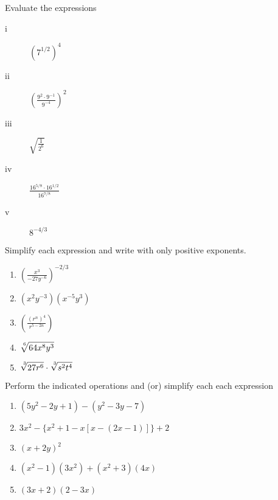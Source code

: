 \documentclass[11pt]{article}
\newenvironment{problem}[2][Problem]{\begin{trivlist}
\item[\hskip \labelsep {\bfseries #1}\hskip \labelsep {\bfseries #2.}]}{\end{trivlist}}
\newenvironment{sol}
    {\emph{Solution:}
    }
    {
    \qed
    }
\begin{document}



\begin{problem}{1}
  Evaluate the expressions
  \begin{description}
  \item[i] $(7^{1/2})^4$
  \item[ii] $\displaystyle\left(\frac{9^2\cdot9^{-1}}{9^{-4}}\right)^2$
  \item[iii] $\displaystyle\sqrt{\frac{1}{2^6}}$
  \item[iv] $\displaystyle \frac{16^{5/8}\cdot16^{1/2}}{16^{7/8}}$
  \item[v] $\displaystyle 8^{-4/3}$
  \end{description}
\end{problem}



\begin{problem}{2}
  Simplify each expression and write with only positive exponents.
  \begin{enumerate}[label=\roman*)]
  \item $\displaystyle\left(\frac{x^3}{-27y^{-6}}\right)^{-2/3}$
  \item $\displaystyle(x^2y^{-3})(x^{-5}y^3)$
  \item $\displaystyle\left(\frac{(r^n)^4}{r^{5-2n}} \right)$
  \item $\displaystyle \sqrt[\leftroot{-2}\uproot{2}6]{64x^8y^3}$
    \item $\displaystyle \sqrt[\leftroot{-2}\uproot{2}3]{27r^6}\cdot\sqrt[\leftroot{-2}\uproot{2}3]{s^2t^4}$
  \end{enumerate}
\end{problem}



\begin{problem}{3}
  Perform the indicated operations and (or) simplify each each expression
  \begin{enumerate}[label=\roman*)]
  \item $(5y^2-2y+1)-(y^2-3y-7)$
  \item $3x^2 -\{x^2 + 1-x[x-(2x-1)]\} + 2$
  \item $(x+2y)^2$
  \item $(x^2-1)(3x^2)+(x^2+3)(4x)$
    \item $(3x+2)(2-3x)$
    \end{enumerate}
\end{problem}
\end{document}

